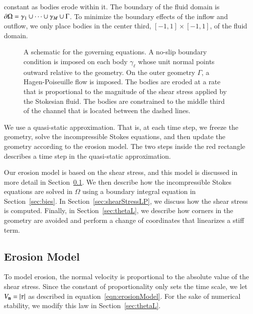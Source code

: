 \documentclass[preprint, 10pt]{elsarticle}
\begin{document}
constant as bodies erode within it.  The boundary of the fluid domain is
${\partial}\Omega = \gamma_1 \cup \cdots \cup \gamma_M \cup \Gamma$.  To
minimize the boundary effects of the inflow and outflow, we only place
bodies in the center third, $[-1,1] \times [-1,1]$, of the fluid domain.
\begin{figure}[htpb]
  \centering
  
  \caption{\label{fig:schematic} A schematic for the governing
    equations.  A no-slip boundary condition is imposed on each body
    $\gamma_\ell$ whose unit normal points outward relative to the
    geometry.  On the outer geometry $\Gamma$, a Hagen-Poiseuille flow
    is imposed.  The bodies are eroded at a rate that is proportional to
    the magnitude of the shear stress applied by the Stokesian fluid.
    The bodies are constrained to the middle third of the channel that
    is located between the dashed lines.}
\end{figure}

We use a quasi-static approximation.  That is, at each time step, we
freeze the geometry, solve the incompressible Stokes equations, and then
update the geometry according to the erosion model.  The two steps
inside the red rectangle describes a time step in the quasi-static
approximation.
%  

Our erosion model is based on the shear stress, and this model is
discussed in more detail in Section~\ref{sec:erosion}.  We then describe
how the incompressible Stokes equations are solved in $\Omega$ using a
boundary integral equation in Section~\ref{sec:bies}.  In
Section~\ref{sec:shearStressLP}, we discuss how the shear stress is
computed.  Finally, in Section~\ref{sec:thetaL}, we describe how corners
in the geometry are avoided and perform a change of coordinates that
linearizes a stiff term.


\subsection{Erosion Model} 
\label{sec:erosion}

To model erosion, the normal velocity is  proportional to the absolute
value of the shear stress.   Since the constant of proportionality only
sets the time scale, we let $V_{\mathbf{n}} = |\tau|$ as described in
equation~\eqref{eqn:erosionModel}. For the sake of numerical stability,
we modify this law in Section~\ref{sec:thetaL}.
\end{document}
